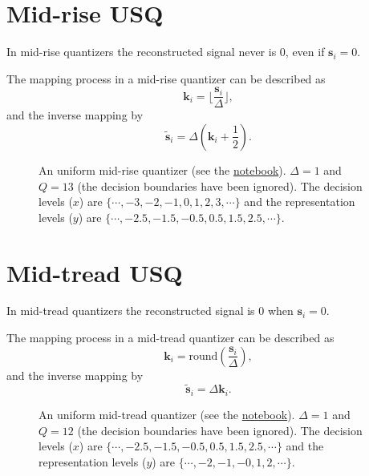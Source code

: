 
\section{Mid-rise USQ}

In mid-rise quantizers the reconstructed signal never is 0, even if
${\mathbf s}_i=0$.

The mapping process in a mid-rise quantizer can be described as
\begin{equation}
  {\mathbf k}_i = \lfloor \frac{{\mathbf s}_i}{\Delta} \rfloor,
  \label{eq:mid-rise}
\end{equation}
and the inverse mapping by
\begin{equation}
  \tilde{\mathbf s}_i = \Delta({\mathbf k}_i + \frac{1}{2}).
  \label{eq:inverse_mid-rise}
\end{equation}

\begin{figure}
  \caption{An uniform mid-rise quantizer (see the
    \href{https://nbviewer.jupyter.org/github/vicente-gonzalez-ruiz/quantization/blob/master/graphics/midrise.ipynb}{notebook}). $\Delta=1$
    and $Q=13$ (the decision boundaries have been ignored). The
    decision levels ($x$) are $\{\cdots,-3,-2,-1,0,1,2,3,\cdots\}$
    and the representation levels ($y$) are
    $\{\cdots,-2.5,-1.5,-0.5,0.5,1.5,2.5,\cdots\}$.}
  \label{fig:midrise}
\end{figure}

\section{Mid-tread USQ}

In mid-tread quantizers the reconstructed signal is 0 when ${\mathbf
  s}_i=0$.

The mapping process in a mid-tread quantizer can be described as
\begin{equation}
  {\mathbf k}_i = \text{round}( \frac{{\mathbf s}_i}{\Delta} ),
  \label{eq:mid-rise}
\end{equation}
and the inverse mapping by
\begin{equation}
  \tilde{\mathbf s}_i = \Delta{\mathbf k}_i.
  \label{eq:inverse_mid-rise}
\end{equation}

\begin{figure}
  \caption{An uniform mid-tread quantizer (see the
    \href{https://nbviewer.jupyter.org/github/vicente-gonzalez-ruiz/quantization/blob/master/graphics/midtread.ipynb}{notebook}). $\Delta=1$
    and $Q=12$ (the decision boundaries have been ignored). The
    decision levels ($x$) are $\{\cdots,-2.5,-1.5,-0.5,0.5,1.5,2.5,\cdots\}$
    and the representation levels ($y$) are
    $\{\cdots,-2,-1,-0,1,2,\cdots\}$.}
  \label{fig:midtread}
\end{figure}

